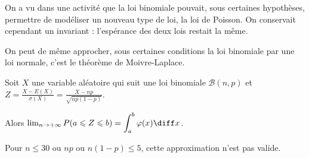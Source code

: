\documentclass[12pt,a4paper,french]{article}
\begin{document}
On a vu dans une activité que la loi binomiale pouvait, sous certaines
hypothèses, permettre de modéliser un nouveau type de loi, la loi de
Poisson. On conservait cependant un invariant : l'espérance des deux
lois restait la même.

On peut de même approcher, sous certaines conditions la loi binomiale
par une loi normale, c'est le théorème de Moivre-Laplace.

\begin{theoreme}[Admis]
  Soit $X$ une variable aléatoire qui suit une loi binomiale
  $\mathcal{B}(n,p)$ et $Z = \frac{X - E(X)}{\sigma(X)} = \frac{X -
  np}{\sqrt{np(1-p)}}$.

  Alors $\lim_{n\to+\infty} P(a \leqslant Z \leqslant b) =
  \displaystyle\int_a^b \varphi(x) \diff x$.
\end{theoreme}

\begin{remarque}
  Pour $n \leqslant 30$ ou $np$ ou $n(1-p) \leqslant 5$, cette
  approximation n'est pas valide.
\end{remarque}
\end{document}
